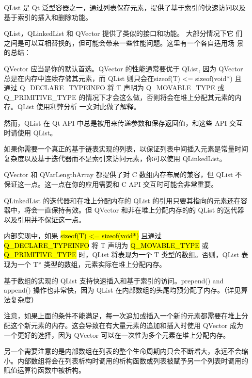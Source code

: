 QList 是 Qt 泛型容器之一，通过列表保存元素，提供了基于索引的快速访问以及基于索引的插入和删除功能。

QList，QLinkedList 和 QVector 提供了类似的接口和功能。 大部分情况下它
们之间是可以互相替换的，但可能会带来一些性能问题。这里有一个各自适用场
景的总结：

\begin{compactitem}[\arr]

\item QVector 应当是你的默认首选。QVector 的性能通常要优于 QList, 因为 QVector 总是在内存中连续存储其元素，而 QList 则只会在sizeof(T) <= sizeof(void*) 且通过 Q\_DECLARE\_TYPEINFO 将 T 声明为 Q\_MOVABLE\_TYPE 或 Q\_PRIMITIVE\_TYPE 的情况下才会这么做，否则将会在堆上分配其元素的内存。QList 使用利弊分析 一文对此做了解释。
\item    然而，QList 在 Qt API 中总是被用来传递参数和保存返回值，和这些 API 交互时请使用 QList。
\item    如果你需要一个真正的基于链表实现的列表，以保证列表中间插入元素是常量时间复杂度以及基于迭代器而不是索引来访问元素，你可以使用 QLinkedList。

\end{compactitem}

\begin{notice}
QVector 和 QVarLengthArray 都提供了对 C 数组内存布局的兼容，但 QList 不保证这一点。这一点在你的应用需要和 C API 交互时可能会非常重要。
\end{notice}

\begin{notice}
QLinkedList 的迭代器和在堆上分配内存的 QList 的引用只要其指向的元素还在容器中，将会一直保持有效。但 QVector 和非在堆上分配内存的的 QList 的迭代器以及引用并不保证这一点。
\end{notice}

内部实现中，如果 \hl{sizeof(T) <= sizeof(void*)} 且通过 \hl{Q\_DECLARE\_TYPEINFO} 将 T 声明为 \hl{Q\_MOVABLE\_TYPE} 或 \hl{Q\_PRIMITIVE\_TYPE} 时，QList 将表现为一个 T 类型的数组。否则，QList 表现为一个 T* 类型的数组，元素实际在堆上分配内存。

基于数组的实现的 QList 支持快速插入和基于索引的访问。prepend() and append() 操作也非常快，因为 QList 在内部数组的头尾均预分配了内存。（详见算法复杂度）

注意，如果上面的条件不能满足，每一次追加或插入一个新的元素都需要在堆上分配这个新元素的内存。这会导致在有大量元素的追加和插入时使用 QVector 成为一个更好的选择，因为 QVector 可以在一次性为多个元素在堆上分配内存。

另一个需要注意的是内部数组在列表的整个生命周期内只会不断增大，永远不会缩小。内部数组将会在列表析构时调用的析构函数或列表被赋予另一个列表时调用的赋值运算符函数中被析构。

